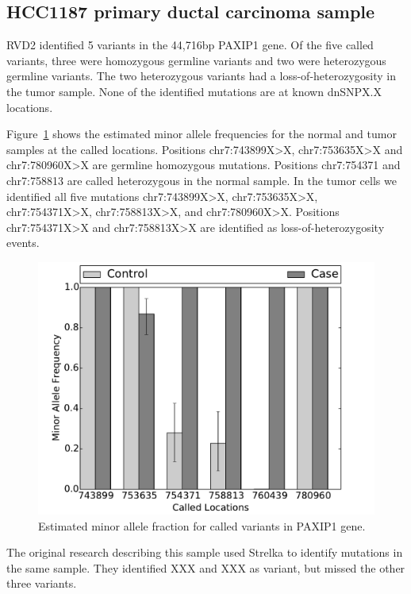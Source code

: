 \documentclass[11pt,reqno]{amsart}
\begin{document}
\subsection{HCC1187 primary ductal carcinoma sample}\label{sec:brca}

RVD2 identified 5 variants in the 44,716bp PAXIP1 gene. Of the five called variants, three were homozygous germline variants and two were heterozygous germline variants. The two heterozygous variants had a loss-of-heterozygosity in the tumor sample. None of the identified mutations are at known dnSNPX.X locations.

Figure~\ref{fig:brca_MAF} shows the estimated minor allele frequencies for the normal and tumor samples at the called locations. Positions chr7:743899X>X, chr7:753635X>X and chr7:780960X>X are germline homozygous mutations. Positions chr7:754371 and chr7:758813 are called heterozygous in the normal sample. In the tumor cells we identified all five mutations chr7:743899X>X, chr7:753635X>X, chr7:754371X>X, chr7:758813X>X, and chr7:780960X>X. Positions chr7:754371X>X and chr7:758813X>X are identified as loss-of-heterozygosity events.

\begin{figure}[h]
\begin{center}
\includegraphics[width=120mm]{pdf_figs/HCC1187_MuBarPlot.pdf}
\caption{Estimated minor allele fraction for called variants in PAXIP1 gene.}
\label{fig:brca_MAF}
\end{center}
\end{figure}

The original research describing this sample used Strelka to identify mutations in the same sample. They identified XXX and XXX as variant, but missed the other three variants.
\end{document}

